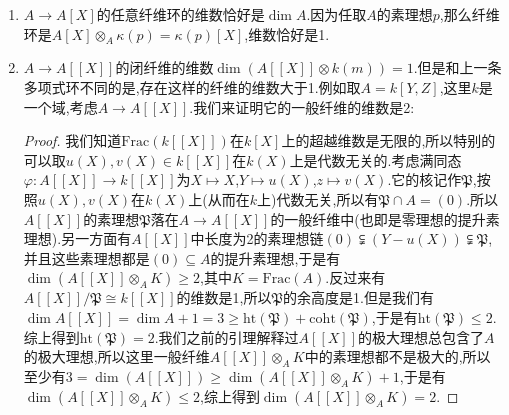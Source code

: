 \begin{enumerate}
\begin{proof}
		\qquad
		
		现在取$A[[X]]$的极大理想$m$,记$m'=m\cap A$,那么$m=(m',X)$.于是有$A[[X]]_m/m'A[[X]]_m=(A[[X]]\otimes_Ak(m'))_{m}=k(m')[[X]]_{m}$这是一个主理想整环,于是维数不超过1.于是得到$\mathrm{ht}(m)\le\mathrm{ht}(m')+1\le\dim A+1$于是取左侧上确界得到$\dim A[[X]]\le\dim A+1$.反过来如果$n$是$A$的极大理想,那么$(n,X)$是$A[[X]]$的极大理想,并且有$(n,X)\cap A=n$.现在注意$A[[X]]$是$A$上平坦的,于是它满足下降条件,于是有维数公式$\mathrm{ht}(n)=\mathrm{ht}(m)+\dim(X)$,这里$X=A[[X]]_n/mA[[X]]_n\cong k(m)[[X]]$,它的维数恰好是1(因为$k(m)$是域).这就得到$\mathrm{ht}(m)+1=\mathrm{ht}(n)\le\dim A[[X]]$.再取上确界得到$\dim A+1\le\dim A[[X]]$.
	\end{proof}
	\item $A\to A[X]$的任意纤维环的维数恰好是$\dim A$.因为任取$A$的素理想$p$,那么纤维环是$A[X]\otimes_A\kappa(p)=\kappa(p)[X]$,维数恰好是1.
	\item $A\to A[[X]]$的闭纤维的维数$\dim(A[[X]]\otimes k(m))=1$.但是和上一条多项式环不同的是,存在这样的纤维的维数大于1.例如取$A=k[Y,Z]$,这里$k$是一个域,考虑$A\to A[[X]]$.我们来证明它的一般纤维的维数是2:
	\begin{proof}
		
		我们知道$\mathrm{Frac}(k[[X]])$在$k[X]$上的超越维数是无限的,所以特别的可以取$u(X),v(X)\in k[[X]]$在$k(X)$上是代数无关的.考虑满同态$\varphi:A[[X]]\to k[[X]]$为$X\mapsto X$,$Y\mapsto u(X)$,$z\mapsto v(X)$.它的核记作$\mathfrak{P}$,按照$u(X),v(X)$在$k(X)$上(从而在$k$上)代数无关,所以有$\mathfrak{P}\cap A=(0)$.所以$A[[X]]$的素理想$\mathfrak{P}$落在$A\to A[[X]]$的一般纤维中(也即是零理想的提升素理想).另一方面有$A[[X]]$中长度为2的素理想链$(0)\subsetneqq(Y-u(X))\subsetneqq\mathfrak{P}$,并且这些素理想都是$(0)\subseteq A$的提升素理想,于是有$\dim(A[[X]]\otimes_AK)\ge2$,其中$K=\mathrm{Frac}(A)$.反过来有$A[[X]]/\mathfrak{P}\cong k[[X]]$的维数是1,所以$\mathfrak{P}$的余高度是1.但是我们有$\dim A[[X]]=\dim A+1=3\ge\mathrm{ht}(\mathfrak{P})+\mathrm{coht}(\mathfrak{P})$,于是有$\mathrm{ht}(\mathfrak{P})\le2$.综上得到$\mathrm{ht}(\mathfrak{P})=2$.我们之前的引理解释过$A[[X]]$的极大理想总包含了$A$的极大理想,所以这里一般纤维$A[[X]]\otimes_AK$中的素理想都不是极大的,所以至少有$3=\dim(A[[X]])\ge\dim(A[[X]]\otimes_AK)+1$,于是有$\dim(A[[X]]\otimes_AK)\le2$,综上得到$\dim(A[[X]]\otimes_AK)=2$.
	\end{proof}
\end{enumerate}

